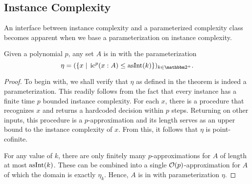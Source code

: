 \subsection{Instance Complexity}
An interface between instance complexity and a parameterized complexity class becomes apparent when we base a parameterization on instance complexity.
\begin{theorem}
\label{thm:nufptic}
  Given a polynomial $p$, any set $A$ is in  with the parameterization
  \begin{equation*}
    \eta \deq (\{x \st \ic^p(x : A) \le \asNat(k)\})_{k \in \binary^+}.
  \end{equation*}
\end{theorem}
\begin{proof}
  To begin with, we shall verify that $\eta$ as defined in the theorem is indeed a parameterization.
  This readily follows from the fact that every instance has a finite time $p$ bounded instance complexity.
  For each $x$, there is a procedure that recognizes $x$ and returns a hardcoded decision within $p$ steps.
  Returning  on other inputs, this procedure is a $p$-approximation and its length serves as an upper bound to the instance complexity of $x$.
  From this, it follows that $\eta$ is point-cofinite.

  For any value of $k$, there are only finitely many $p$-approximations for $A$ of length at most $\operatorname{asInt}(k)$.
  These can be combined into a single $\operatorname{\mathcal{O}}(p)$-approximation for $A$ of which the domain is exactly $\eta_k$.
  Hence, $A$ is in  with parameterization $\eta$.
\end{proof}

